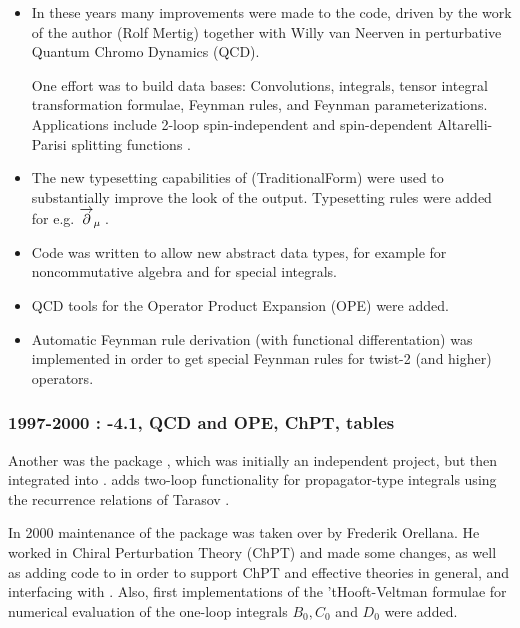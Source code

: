 \begin{itemize}

\item
In these years many improvements were made to the code, driven by the work of the author (Rolf Mertig) 
together with Willy van Neerven in perturbative Quantum Chromo Dynamics (QCD).

One effort was to build data bases: Convolutions, integrals, tensor integral transformation formulae, Feynman rules, 
and Feynman parameterizations. 
Applications include 2-loop spin-independent and spin-dependent Altarelli-Parisi splitting functions \cite{spinsplit}.

\item The new typesetting capabilities of  (TraditionalForm) were used to substantially improve the look of the output. Typesetting rules were added for e.g. \({\overvar{\partial }{\rightarrow}}_{\mu } \multsp \).

\item Code was written to allow new abstract data types, for example for noncommutative algebra and for special integrals.

\item QCD tools for the Operator Product Expansion  (OPE)
were added.

\item Automatic Feynman rule derivation (with functional
differentation) was implemented in order to get special Feynman rules
for twist-2 (and higher) operators.

\end{itemize}

\subsubsection*{1997-2000 : -4.1, QCD and OPE, ChPT, tables}

Another was the package \tarcer, which was initially an independent project, but then integrated into \fc.  \tarcer \cite{Mertig:1998vk} adds two-loop functionality for propagator-type integrals using the recurrence relations of Tarasov \cite{Tarasov:1997kx}.

In 2000 maintenance of the package was taken over by Frederik Orellana. He worked in Chiral Perturbation Theory \cite{Gasser:1984gg} (ChPT) and made some changes, as well as adding code to \fc in order to support ChPT and effective theories in general, and interfacing with \fa. Also, first implementations of the 'tHooft-Veltman formulae \cite{'tHooft:1978xw} for numerical evaluation of the one-loop integrals $B_0, C_0$ and $D_0$ were added.

